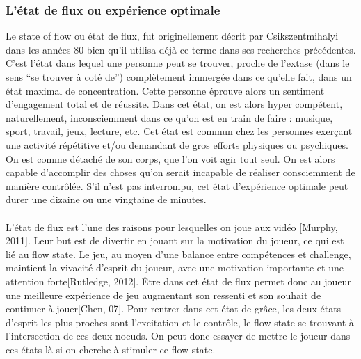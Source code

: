 	\subsubsection{L'état de flux ou expérience optimale}
Le state of flow ou état de flux, fut originellement décrit par Csikszentmihalyi\cite{Csik88} dans les années 80 bien qu'il utilisa déjà ce terme dans ses recherches précédentes\cite{Csik75}. C'est l'état dans lequel une personne peut se trouver, proche de l’extase (dans le sens “se trouver à coté de”) complètement immergée dans ce qu'elle fait, dans un état maximal de concentration. Cette personne éprouve alors un sentiment d'engagement total et de réussite. Dans cet état, on est alors hyper compétent, naturellement, inconsciemment dans ce qu’on est en train de faire : musique, sport, travail, jeux, lecture, etc. Cet état est commun chez les personnes exerçant une activité répétitive et/ou demandant de gros efforts physiques ou psychiques. On est comme détaché de son corps, que l’on voit agir tout seul. On est alors capable d’accomplir des choses qu’on serait incapable de réaliser consciemment de manière contrôlée. S’il n’est pas interrompu, cet état d'expérience optimale peut durer une dizaine ou une vingtaine de minutes.

\paragraph{}
L’état de flux est l’une des raisons pour lesquelles on joue aux vidéo [Murphy, 2011]\cite{Murp11}. Leur but est de divertir en jouant sur la motivation du joueur, ce qui est lié au flow state. Le jeu, au moyen d’une balance entre compétences et challenge, maintient la vivacité d’esprit du joueur, avec une motivation importante et une attention forte[Rutledge, 2012]\cite{Rutl12}. Être dans cet état de flux permet donc au joueur une meilleure expérience de jeu augmentant son ressenti et son souhait de continuer à jouer[Chen, 07]\cite{Chen07}. Pour rentrer dans cet état de grâce, les deux états d’esprit les plus proches sont l’excitation et le contrôle, le flow state se trouvant à l’intersection de ces deux noeuds. On peut donc essayer de mettre le joueur dans ces états là si on cherche à stimuler ce flow state.

